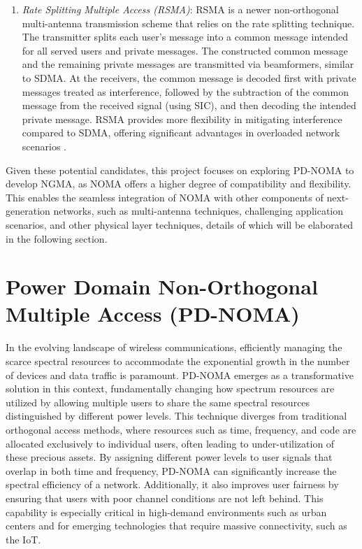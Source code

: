 \begin{enumerate}
    \item \textit{Rate Splitting Multiple Access (RSMA)}: RSMA is a newer non-orthogonal multi-antenna transmission scheme that relies on the rate splitting technique. The transmitter splits each user's message into a common message intended for all served users and private messages. The constructed common message and the remaining private messages are transmitted via beamformers, similar to SDMA. At the receivers, the common message is decoded first with private messages treated as interference, followed by the subtraction of the common message from the received signal (using SIC), and then decoding the intended private message. RSMA provides more flexibility in mitigating interference compared to SDMA, offering significant advantages in overloaded network scenarios \cite{NAGMA}.
\end{enumerate}

Given these potential candidates, this project focuses on exploring PD-NOMA to develop NGMA, as NOMA offers a higher degree of compatibility and flexibility. This enables the seamless integration of NOMA with other components of next-generation networks, such as multi-antenna techniques, challenging application scenarios, and other physical layer techniques, details of which will be elaborated in the following section.
\section{Power Domain Non-Orthogonal Multiple Access (PD-NOMA)}

In the evolving landscape of wireless communications, efficiently managing the scarce spectral resources to accommodate the exponential growth in the number of devices and data traffic is paramount. PD-NOMA emerges as a transformative solution in this context, fundamentally changing how spectrum resources are utilized by allowing multiple users to share the same spectral resources distinguished by different power levels. This technique diverges from traditional orthogonal access methods, where resources such as time, frequency, and code are allocated exclusively to individual users, often leading to under-utilization of these precious assets. By assigning different power levels to user signals that overlap in both time and frequency, PD-NOMA can significantly increase the spectral efficiency of a network. Additionally, it also improves user fairness by ensuring that users with poor channel conditions are not left behind. This capability is especially critical in high-demand environments such as urban centers and for emerging technologies that require massive connectivity, such as the IoT.



